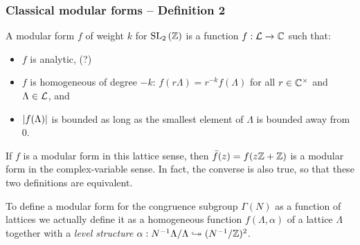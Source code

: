 \begin{frame} \frametitle{Classical modular forms -- Definition 2}
  \begin{definition}
    A modular form $f$ of weight $k$ for $\SL[2]{\ZZ}$ is a function $f : \LL \to \CC$ such that:
    \begin{itemize}
      \item $f$ is analytic\pause, \hfill (?) \pause
      \item $f$ is homogeneous of degree $-k$: \pause $f(r\Lambda) = r^{-k} f(\Lambda)$ for all $r \in \CC^\times$ and $\Lambda \in \LL$\pause, and
      \item $\abs{f(\Lambda)}$ is bounded as long as the smallest element of $\Lambda$ is bounded away from $0$.\pause
    \end{itemize}
  \end{definition}

  If $f$ is a modular form in this lattice sense, then $\bar{f}(z) = f(z\ZZ+\ZZ)$ is a modular form in the complex-variable sense.
  In fact, the converse is also true, so that these two definitions are equivalent. \pause

  To define a modular form for the congruence subgroup $\Gamma(N)$ as a function of lattices we actually define it as a homogeneous function $f(\Lambda,\alpha)$ of a lattice $\Lambda$ together with a \emph{level structure} $\alpha : N^{-1}\Lambda/\Lambda \ionto (N^{-1}/\ZZ)^2$.
\end{frame}